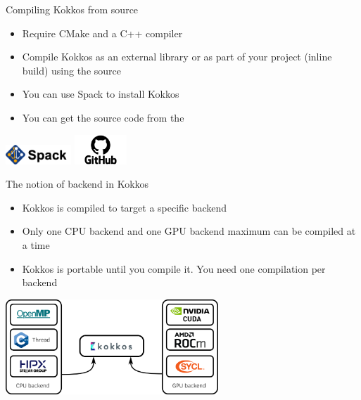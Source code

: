 \documentclass[aspectratio=169]{beamer}
\begin{document}

\begin{frame}{Compiling Kokkos from source}
    \begin{itemize}
        \item Require CMake and a C++ compiler
        \item Compile Kokkos as an external library or as part of your project (inline build) using the source
        \item You can use Spack to install Kokkos
        \item You can get the source code from the 
    \end{itemize}
    \begin{center}
        \includegraphics[height=2em]{spack.png}%
        \hspace{1em}%
        \includegraphics[height=3em]{GitHub-logo.png}
    \end{center}
\end{frame}


\begin{frame}{The notion of backend in Kokkos}
    \begin{itemize}
        \item Kokkos is compiled to target a specific backend
        \item Only one CPU backend and one GPU backend maximum can be compiled at a time
        \item Kokkos is portable until you compile it. You need one compilation per backend
    \end{itemize}
    \begin{center}
        \includegraphics[width=0.6\textwidth]{kokkos_backend.png}
    \end{center}
\end{frame}
\end{document}
